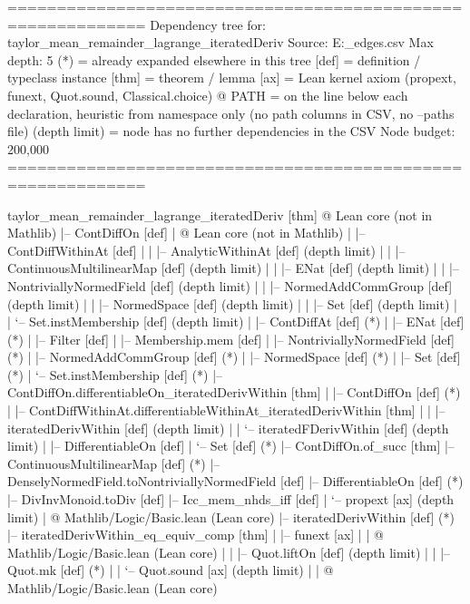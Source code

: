 \documentclass[11pt,reqno]{amsart}
\begin{document}
\text{ \ } \text{ \ } 
\begin{verbatimbox}
============================================================
Dependency tree for: taylor_mean_remainder_lagrange_iteratedDeriv
Source: E:\archives\Processings\compile\scripts\mathlib_edges.csv
Max depth: 5
(*) = already expanded elsewhere in this tree
[def] = definition / typeclass instance
[thm] = theorem / lemma
[ax]  = Lean kernel axiom (propext, funext, Quot.sound, Classical.choice)
@ PATH = on the line below each declaration, heuristic from namespace
         only (no path columns in CSV, no --paths file)
(depth limit) = node has no further dependencies in the CSV
Node budget: 200,000
============================================================

taylor_mean_remainder_lagrange_iteratedDeriv  [thm]
@ Lean core (not in Mathlib)
|-- ContDiffOn  [def]
|   @ Lean core (not in Mathlib)
|   |-- ContDiffWithinAt  [def]
|   |   |-- AnalyticWithinAt  [def]   (depth limit)
|   |   |-- ContinuousMultilinearMap  [def]   (depth limit)
|   |   |-- ENat  [def]   (depth limit)
|   |   |-- NontriviallyNormedField  [def]   (depth limit)
|   |   |-- NormedAddCommGroup  [def]   (depth limit)
|   |   |-- NormedSpace  [def]   (depth limit)
|   |   |-- Set  [def]   (depth limit)
|   |   `-- Set.instMembership  [def]   (depth limit)
|   |-- ContDiffAt  [def]   (*)
|   |-- ENat  [def]   (*)
|   |-- Filter  [def]
|   |-- Membership.mem  [def]
|   |-- NontriviallyNormedField  [def]   (*)
|   |-- NormedAddCommGroup  [def]   (*)
|   |-- NormedSpace  [def]   (*)
|   |-- Set  [def]   (*)
|   `-- Set.instMembership  [def]   (*)
|-- ContDiffOn.differentiableOn_iteratedDerivWithin  [thm]
|   |-- ContDiffOn  [def]   (*)
|   |-- ContDiffWithinAt.differentiableWithinAt_iteratedDerivWithin [thm]
|   |   |-- iteratedDerivWithin  [def]   (depth limit)
|   |   `-- iteratedFDerivWithin  [def]   (depth limit)
|   |-- DifferentiableOn  [def]
|   `-- Set  [def]   (*)
|-- ContDiffOn.of_succ  [thm]
|-- ContinuousMultilinearMap  [def]   (*)
|-- DenselyNormedField.toNontriviallyNormedField  [def]
|-- DifferentiableOn  [def]   (*)
|-- DivInvMonoid.toDiv  [def]
|-- Icc_mem_nhds_iff  [def]
|   `-- propext  [ax]   (depth limit)
|       @ Mathlib/Logic/Basic.lean (Lean core)
|-- iteratedDerivWithin  [def]   (*)
|-- iteratedDerivWithin_eq_equiv_comp  [thm]
|   |-- funext  [ax]
|   |   @ Mathlib/Logic/Basic.lean (Lean core)
|   |   |-- Quot.liftOn  [def]   (depth limit)
|   |   |-- Quot.mk  [def]   (*)
|   |   `-- Quot.sound  [ax]   (depth limit)
|   |   @ Mathlib/Logic/Basic.lean (Lean core)

\end{verbatimbox}
\end{document}
